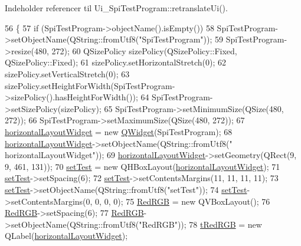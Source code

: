 Indeholder referencer til Ui\+\_\+\+Spi\+Test\+Program\+::retranslate\+Ui().


\begin{DoxyCode}
56     \{
57         \textcolor{keywordflow}{if} (SpiTestProgram->objectName().isEmpty())
58             SpiTestProgram->setObjectName(QString::fromUtf8(\textcolor{stringliteral}{"SpiTestProgram"}));
59         SpiTestProgram->resize(480, 272);
60         QSizePolicy sizePolicy(QSizePolicy::Fixed, QSizePolicy::Fixed);
61         sizePolicy.setHorizontalStretch(0);
62         sizePolicy.setVerticalStretch(0);
63         sizePolicy.setHeightForWidth(SpiTestProgram->sizePolicy().hasHeightForWidth());
64         SpiTestProgram->setSizePolicy(sizePolicy);
65         SpiTestProgram->setMinimumSize(QSize(480, 272));
66         SpiTestProgram->setMaximumSize(QSize(480, 272));
67         \hyperlink{class_ui___spi_test_program_a8d9662f61dc85ce78495602f1d03006f}{horizontalLayoutWidget} = \textcolor{keyword}{new} \hyperlink{class_q_widget}{QWidget}(SpiTestProgram);
68         \hyperlink{class_ui___spi_test_program_a8d9662f61dc85ce78495602f1d03006f}{horizontalLayoutWidget}->setObjectName(QString::fromUtf8(\textcolor{stringliteral}{"
      horizontalLayoutWidget"}));
69         \hyperlink{class_ui___spi_test_program_a8d9662f61dc85ce78495602f1d03006f}{horizontalLayoutWidget}->setGeometry(QRect(9, 9, 461, 131));
70         \hyperlink{class_ui___spi_test_program_ab40f35f9bcce17af63ba573e1e8ee485}{setTest} = \textcolor{keyword}{new} QHBoxLayout(\hyperlink{class_ui___spi_test_program_a8d9662f61dc85ce78495602f1d03006f}{horizontalLayoutWidget});
71         \hyperlink{class_ui___spi_test_program_ab40f35f9bcce17af63ba573e1e8ee485}{setTest}->setSpacing(6);
72         \hyperlink{class_ui___spi_test_program_ab40f35f9bcce17af63ba573e1e8ee485}{setTest}->setContentsMargins(11, 11, 11, 11);
73         \hyperlink{class_ui___spi_test_program_ab40f35f9bcce17af63ba573e1e8ee485}{setTest}->setObjectName(QString::fromUtf8(\textcolor{stringliteral}{"setTest"}));
74         \hyperlink{class_ui___spi_test_program_ab40f35f9bcce17af63ba573e1e8ee485}{setTest}->setContentsMargins(0, 0, 0, 0);
75         \hyperlink{class_ui___spi_test_program_a266d140f4ccd88877aee1b242908b21d}{RedRGB} = \textcolor{keyword}{new} QVBoxLayout();
76         \hyperlink{class_ui___spi_test_program_a266d140f4ccd88877aee1b242908b21d}{RedRGB}->setSpacing(6);
77         \hyperlink{class_ui___spi_test_program_a266d140f4ccd88877aee1b242908b21d}{RedRGB}->setObjectName(QString::fromUtf8(\textcolor{stringliteral}{"RedRGB"}));
78         \hyperlink{class_ui___spi_test_program_a44f9277d36451995887541d6e333c772}{tRedRGB} = \textcolor{keyword}{new} QLabel(\hyperlink{class_ui___spi_test_program_a8d9662f61dc85ce78495602f1d03006f}{horizontalLayoutWidget});

\end{DoxyCode}
